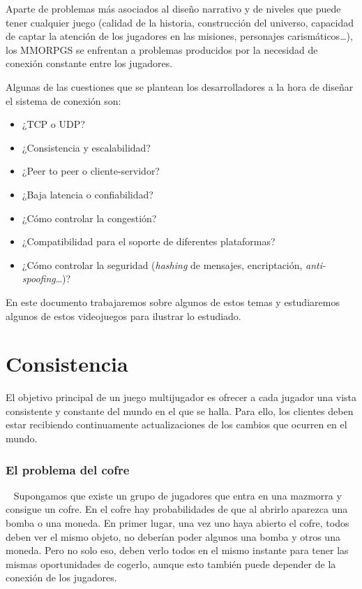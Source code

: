 \documentclass[runningheads]{llncs}
\begin{document}
Aparte de problemas más asociados al diseño narrativo y de niveles que puede tener cualquier juego (calidad de la historia, construcción del universo, capacidad de captar la atención de los jugadores en las misiones, personajes carismáticos\ldots), los MMORPGS se enfrentan a problemas producidos por la necesidad de conexión constante entre los jugadores.

Algunas de las cuestiones que se plantean los desarrolladores a la hora de diseñar el sistema de conexión son:~\cite{mmg_love}

\begin{itemize}
	\item
		¿TCP o UDP\@?
	\item
		¿Consistencia y escalabilidad?
	\item
		¿Peer to peer o cliente-servidor?
	\item
		¿Baja latencia o confiabilidad?
	\item
		¿Cómo controlar la congestión?
	\item
		¿Compatibilidad para el soporte de diferentes plataformas?
	\item
		¿Cómo controlar la seguridad (\textit{hashing} de mensajes, encriptación, \textit{anti-spoofing}\ldots)?
\end{itemize}

En este documento trabajaremos sobre algunos de estos temas y estudiaremos algunos de estos videojuegos para ilustrar lo estudiado.

\section{Consistencia}

El objetivo principal de un juego multijugador es ofrecer a cada jugador una vista consistente y constante del mundo en el que se halla.
Para ello, los clientes deben estar recibiendo continuamente actualizaciones de los cambios que ocurren en el mundo.

\subsubsection{El problema del cofre}~\cite{dge_mmosg}
Supongamos que existe un grupo de jugadores que entra en una mazmorra y consigue un cofre.
En el cofre hay probabilidades de que al abrirlo aparezca una bomba o una moneda.
En primer lugar, una vez uno haya abierto el cofre, todos deben ver el mismo objeto, no deberían poder algunos una bomba y otros una moneda.
Pero no solo eso, deben verlo todos en el mismo instante para tener las mismas oportunidades de cogerlo, aunque esto también puede depender de la conexión de los jugadores.
\end{document}

